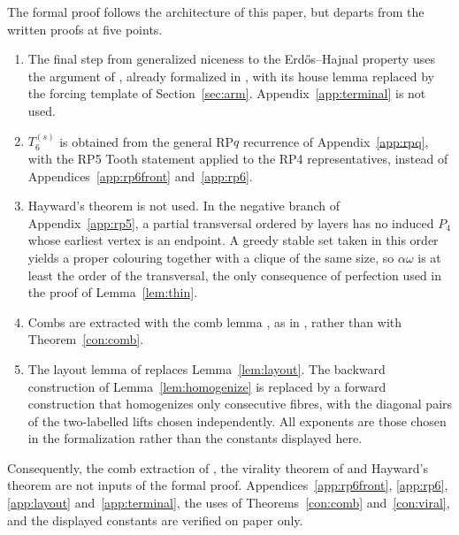 \documentclass[11pt,a4paper]{article}
\theoremstyle{definition}
\theoremstyle{remark}
\numberwithin{equation}{section}
\begin{document}
The formal proof follows the architecture of this paper, but departs from the written proofs at five points.
\begin{enumerate}[label=(\roman*)]
\item The final step from generalized niceness to the Erd\H{o}s--Hajnal property uses the argument of \cite{nss7}, already formalized in \cite{p6}, with its house lemma replaced by the forcing template of Section~\ref{sec:arm}. Appendix~\ref{app:terminal} is not used.
\item \(T_6^{(s)}\) is obtained from the general RP\(q\) recurrence of Appendix~\ref{app:rpq}, with the RP5 Tooth statement applied to the RP4 representatives, instead of Appendices~\ref{app:rp6front} and~\ref{app:rp6}.
\item Hayward's theorem is not used. In the negative branch of Appendix~\ref{app:rp5}, a partial transversal ordered by layers has no induced \(P_4\) whose earliest vertex is an endpoint. A greedy stable set taken in this order yields a proper colouring together with a clique of the same size, so \(\alpha\omega\) is at least the order of the transversal, the only consequence of perfection used in the proof of Lemma~\ref{lem:thin}.
\item Combs are extracted with the comb lemma \cite[Lemma~4.3]{nss7}, as in \cite{p6}, rather than with Theorem~\ref{con:comb}.
\item The layout lemma of \cite{p6} replaces Lemma~\ref{lem:layout}. The backward construction of Lemma~\ref{lem:homogenize} is replaced by a forward construction that homogenizes only consecutive fibres, with the diagonal pairs of the two-labelled lifts chosen independently. All exponents are those chosen in the formalization rather than the constants displayed here.
\end{enumerate}
Consequently, the comb extraction of \cite{hjz}, the virality theorem of \cite{bfp} and Hayward's theorem \cite{hayward} are not inputs of the formal proof. Appendices~\ref{app:rp6front}, \ref{app:rp6}, \ref{app:layout} and~\ref{app:terminal}, the uses of Theorems~\ref{con:comb} and~\ref{con:viral}, and the displayed constants are verified on paper only.
\end{document}

